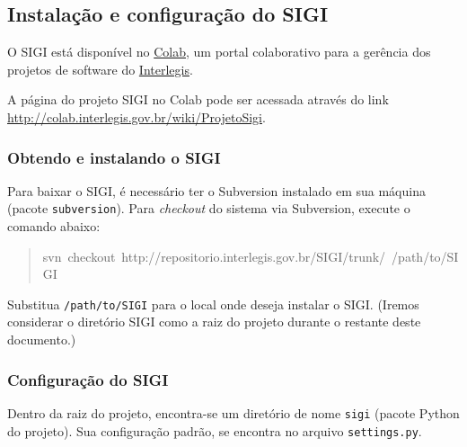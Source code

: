
\hypertarget{instala-o-e-configura-o-do-sigi}{}
\subsection*{Instalação e configuração do SIGI}

O SIGI está disponível no \href{http://colab.interlegis.gov.br}{Colab},
um portal colaborativo para a gerência dos projetos de software do
\href{http://www.interlegis.gov.br}{Interlegis}.

A página do projeto SIGI no Colab pode ser acessada através do link
\href{http://colab.interlegis.gov.br/wiki/ProjetoSigi}{http://colab.interlegis.gov.br/wiki/ProjetoSigi}.



\hypertarget{obtendo-e-instalando-o-sigi}{}
\subsubsection*{Obtendo e instalando o SIGI}

Para baixar o SIGI, é necessário ter o Subversion instalado em sua
máquina (pacote \texttt{subversion}). Para \emph{checkout} do sistema via
Subversion, execute o comando abaixo:
\begin{quote}{\ttfamily \raggedright \noindent
svn~checkout~http://repositorio.interlegis.gov.br/SIGI/trunk/~/path/to/SIGI
}\end{quote}

Substitua \texttt{/path/to/SIGI} para o local onde deseja instalar o
SIGI. (Iremos considerar o diretório SIGI como a raiz do projeto
durante o restante deste documento.)



\hypertarget{configura-o-do-sigi}{}
\subsubsection*{Configuração do SIGI}

Dentro da raiz do projeto, encontra-se um diretório de nome \texttt{sigi}
(pacote Python do projeto). Sua configuração padrão, se encontra no
arquivo \texttt{settings.py}.

